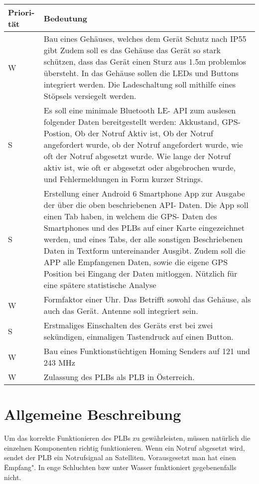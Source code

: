 \newpage
\begin{tabular}{| p{1.5cm} | p{13.5cm} |}
	
	\hline
	\textbf{Priori-} \newline \textbf{tät} & 
	\textbf{Bedeutung} \\
	\hline
	
	W & 
	Bau eines Gehäuses, welches dem Gerät Schutz nach IP55 gibt
	Zudem soll es das Gehäuse das Gerät so stark schützen, dass das Gerät einen Sturz aus 1.5m problemlos übersteht.
	In das Gehäuse sollen die LEDs und Buttons integriert werden. Die Ladeschaltung soll mithilfe eines Stöpsels versiegelt werden.\\
	\hline
	S &
	Es soll eine minimale Bluetooth LE- API zum auslesen folgender Daten bereitgestellt werden: Akkustand, GPS- Postion, Ob der Notruf Aktiv ist, Ob der Notruf angefordert wurde, ob der Notruf angefordert wurde, wie oft der Notruf abgesetzt wurde. Wie lange der Notruf aktiv ist, wie oft er abgesetzt oder abgebrochen wurde, und Fehlermeldungen in Form kurzer Strings.\\
	\hline
	S &
	Erstellung einer Android 6 Smartphone App zur Ausgabe der über die oben beschriebenen API- Daten. Die App soll einen Tab haben, in welchem die GPS- Daten des Smartphones und des PLBs auf einer Karte eingezeichnet werden, und eines Tabs, der alle sonstigen Beschriebenen Daten in Textform untereinander Ausgibt. Zudem soll die APP alle Empfangenen Daten, sowie die eigene GPS Position bei Eingang der Daten mitloggen. Nützlich für eine spätere statistische Analyse\\
	\hline
	
	W & 
	Formfaktor einer Uhr. Das Betrifft sowohl das Gehäuse, als auch das Gerät. Antenne soll integriert sein.\\
	\hline
	
	S &
	Erstmaliges Einschalten des Geräts erst bei zwei sekündigen, einmaligen Tastendruck auf einen Button.\\
	\hline
	
	W & 
	Bau eines Funktionstüchtigen Homing Senders auf 121 und 243 MHz\\
	\hline
	
	W & 
	Zulassung des PLBs als PLB in Österreich.\\
	\hline
	
\end{tabular}


\newpage

\section{Allgemeine Beschreibung}
Um das korrekte Funktionieren des PLBs zu gewährleisten, müssen natürlich die einzelnen Komponenten richtig funktionieren. Wenn ein Notruf abgesetzt wird, sendet der PLB ein Notrufsignal an Satelliten. Vorausgesetzt man hat einen Ëmpfang". In enge Schluchten bzw unter Wasser funktioniert gegebenenfalls nicht.


